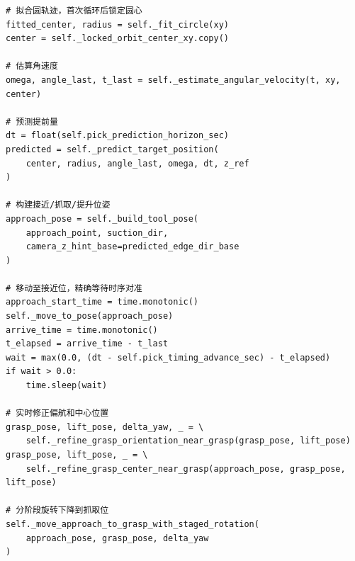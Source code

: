 \documentclass[12pt,a4paper]{article}
\begin{document}
\begin{lstlisting}[caption={目标位置预测与抓取时序控制（\texttt{\_run\_cycle\_once} 节选）}]
# 拟合圆轨迹，首次循环后锁定圆心
fitted_center, radius = self._fit_circle(xy)
center = self._locked_orbit_center_xy.copy()

# 估算角速度
omega, angle_last, t_last = self._estimate_angular_velocity(t, xy, center)

# 预测提前量
dt = float(self.pick_prediction_horizon_sec)
predicted = self._predict_target_position(
    center, radius, angle_last, omega, dt, z_ref
)

# 构建接近/抓取/提升位姿
approach_pose = self._build_tool_pose(
    approach_point, suction_dir,
    camera_z_hint_base=predicted_edge_dir_base
)

# 移动至接近位，精确等待时序对准
approach_start_time = time.monotonic()
self._move_to_pose(approach_pose)
arrive_time = time.monotonic()
t_elapsed = arrive_time - t_last
wait = max(0.0, (dt - self.pick_timing_advance_sec) - t_elapsed)
if wait > 0.0:
    time.sleep(wait)

# 实时修正偏航和中心位置
grasp_pose, lift_pose, delta_yaw, _ = \
    self._refine_grasp_orientation_near_grasp(grasp_pose, lift_pose)
grasp_pose, lift_pose, _ = \
    self._refine_grasp_center_near_grasp(approach_pose, grasp_pose, lift_pose)

# 分阶段旋转下降到抓取位
self._move_approach_to_grasp_with_staged_rotation(
    approach_pose, grasp_pose, delta_yaw
)
\end{lstlisting}
\end{document}
